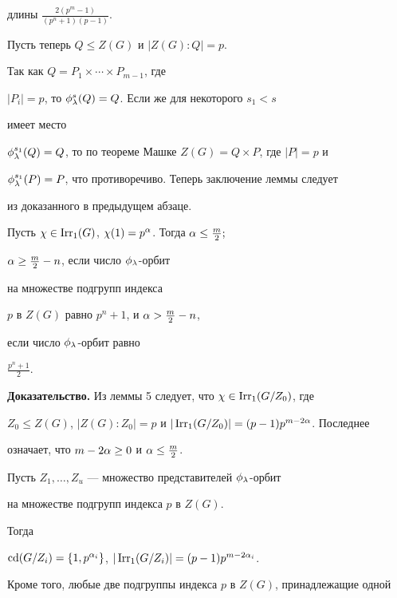 \begin{pf}
длины $\frac{2(p^m-1)}{(p^n+1)(p-1)}$.





Пусть теперь $Q\le Z(G)$ и $|Z(G):Q|=p$. 


Так как $Q=P_1\times\dotsb\times P_{m-1}$, где


$|P_i|=p$, то $\phi_\lambda^s(Q)=Q$. Если же для некоторого $s_1<s$


имеет место


$\phi_\lambda^{s_1}(Q)=Q$, то по теореме Машке $Z(G)=Q\times P$, где $|P|=p$ и


$\phi_\lambda^{s_1}(P)=P$, что противоречиво. Теперь заключение леммы следует


из доказанного в предыдущем абзаце.


\end{pf}








\begin{lem}


Пусть $\chi\in\operatorname{Irr_1}(G)$, $\chi(1)=p^\alpha$. Тогда $\alpha\le\frac m2;$


$\alpha\ge\frac m2-n$, если число $\phi_\lambda$-орбит


на множестве подгрупп индекса


$p$ в $Z(G)$ равно $p^n+1$, и $\alpha>\frac m2-n$,


если число $\phi_\lambda$-орбит равно 


$\frac{p^n+1}{2}$.


\end{lem}








{\bf Доказательство.} Из леммы 5 следует, что $\chi\in\operatorname{Irr_1}(G/Z_0)$, где 


$Z_0\le Z(G)$, $|Z(G):Z_0|=p$ и $|\operatorname{Irr_1}(G/Z_0)|=(p-1)p^{m-2\alpha}$. Последнее 


означает, что $m-2\alpha\ge0$ и $\alpha\le\frac m2$.





Пусть $Z_1,\dotsc,Z_u$ --- множество представителей $\phi_\lambda$-орбит 


на множестве подгрупп индекса $p$ в $Z(G)$. 


Тогда


$\operatorname{cd}(G/Z_i)=\lbrace1,p^{\alpha_i}\rbrace$, $|\operatorname{Irr_1}(G/Z_i)|=(p-1)p^{m-2\alpha_i}$.


Кроме того, любые две подгруппы индекса $p$ в $Z(G)$, принадлежащие одной 


